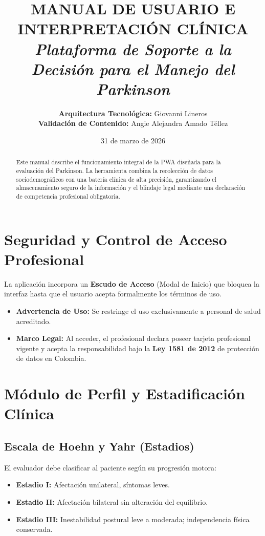 \documentclass[12pt,a4paper]{article}
\title{
    \vspace{-2cm}
    \textcolor{rojoUMB}{\textbf{MANUAL DE USUARIO E INTERPRETACIÓN CLÍNICA}}\\
    \large \textit{Plataforma de Soporte a la Decisión para el Manejo del Parkinson}
}
\author{\textbf{Arquitectura Tecnológica:} Giovanni Lineros \\ \textbf{Validación de Contenido:} Angie Alejandra Amado Téllez}
\date{31 de marzo de 2026}
\begin{document}
\maketitle

\begin{abstract}
Este manual describe el funcionamiento integral de la PWA diseñada para la evaluación del Parkinson. La herramienta combina la recolección de datos sociodemográficos con una batería clínica de alta precisión, garantizando el almacenamiento seguro de la información y el blindaje legal mediante una declaración de competencia profesional obligatoria.
\end{abstract}

\section{Seguridad y Control de Acceso Profesional}
La aplicación incorpora un \textbf{Escudo de Acceso} (Modal de Inicio) que bloquea la interfaz hasta que el usuario acepta formalmente los términos de uso. 
\begin{itemize}
    \item \textbf{Advertencia de Uso:} Se restringe el uso exclusivamente a personal de salud acreditado.
    \item \textbf{Marco Legal:} Al acceder, el profesional declara poseer tarjeta profesional vigente y acepta la responsabilidad bajo la \textbf{Ley 1581 de 2012} de protección de datos en Colombia.
\end{itemize}

\section{Módulo de Perfil y Estadificación Clínica}

\subsection{Escala de Hoehn y Yahr (Estadios)}
El evaluador debe clasificar al paciente según su progresión motora:
\begin{itemize}
    \item \textbf{Estadio I:} Afectación unilateral, síntomas leves.
    \item \textbf{Estadio II:} Afectación bilateral sin alteración del equilibrio.
    \item \textbf{Estadio III:} Inestabilidad postural leve a moderada; independencia física conservada.
\end{itemize}
\end{document}
